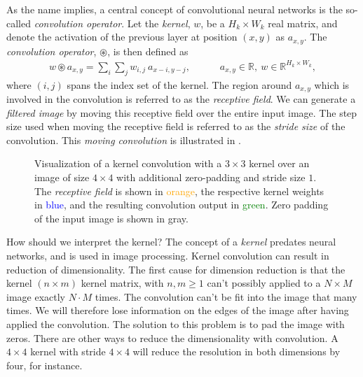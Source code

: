 As the name implies, a central concept of convolutional neural networks is the so-called \textit{convolution operator}.
Let the \textit{kernel}, $w$, be a $H_k \times W_k$ real matrix, and denote the activation of the previous layer at position $(x, y)$ as $a_{x, y}$.
The \textit{convolution operator}, $\circledast$, is then defined as
%
\begin{align*}
  w \circledast a_{x, y} = \sum_{i} \sum_{j} w_{i, j} ~ a_{x - i, y - j},
  \hspace{3em}
    a_{x, y} \in \mathbb{R},~
    w \in \mathbb{R}^{H_k \times W_k},
\end{align*}
%
where $(i, j)$ spans the index set of the kernel.
The region around $a_{x,y}$ which is involved in the convolution is referred to as the \textit{receptive field}.
We can generate a \textit{filtered image} by moving this receptive field over the entire input image.
The step size used when moving the receptive field is referred to as the \textit{stride size} of the convolution.
This \textit{moving convolution} is illustrated in .

\begin{figure}[htb]
  
  \caption{
    Visualization of a kernel convolution with a $3 \times 3$ kernel over an image of size $4 \times 4$ with additional zero-padding and stride size $1$.
    The \textit{receptive field} is shown in \textcolor{orange}{orange}, the respective kernel weights in \textcolor{blue}{blue}, and the resulting convolution output in \textcolor{green}{green}.
    Zero padding of the input image is shown in gray.
  }
  \label{fig:convolution}
\end{figure}


How should we interpret the kernel?
The concept of a \textit{kernel} predates neural networks, and is used in image processing.
Kernel convolution can result in reduction of dimensionality.
The first cause for dimension reduction is that the kernel $(n \times m)$ kernel matrix, with $n, m \geq 1$ can't possibly applied to a $N \times M$ image exactly $N \cdot M$ times. The convolution can't be fit into the image that many times.
We will therefore lose information on the edges of the image after having applied the convolution.
The solution to this problem is to pad the image with zeros.
There are other ways to reduce the dimensionality with convolution.
A $4 \times 4$ kernel with stride $4 \times 4$ will reduce the resolution in both dimensions by four, for instance.
